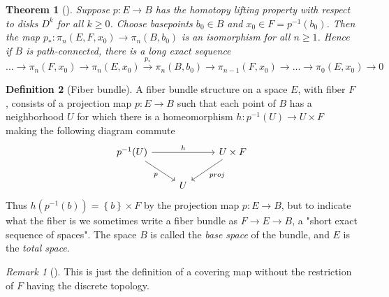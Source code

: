 \documentclass[reqno]{amsart}
\newtheorem{theorem}{Theorem}[section]
\theoremstyle{definition}
\newtheorem{definition}[theorem]{Definition}
\theoremstyle{remark}
\newtheorem*{remark}{Remark}
\begin{document}
\begin{theorem}[]
    Suppose $p \colon E \to B$ has the homotopy
    lifting property with respect to disks
    $D^{k}$ for all $k \ge 0$. Choose basepoints
    $b_0 \in B$ and
    $x_0 \in F = p^{-1}\left( b_0 \right) $. Then
    the map $p_* \colon \pi_n \left( E, F,x_0 \right) 
    \to \pi_n \left( B, b_0 \right) $ is an isomorphism
    for all $n\ge 1$. Hence if $B$ is
    path-connected, there is a long exact sequence
    \[
    \ldots \to \pi_n \left( F,x_0 \right) \to 
    \pi_n \left( E,x_0 \right) \stackrel{p_*}{\to }
    \pi_n \left( B,b_0 \right) \to 
    \pi_{n-1}(F,x_0) \to \ldots \to 
    \pi_0 \left( E,x_0 \right) \to 0
    \] 
\end{theorem}


\begin{definition}[Fiber bundle]
    A fiber bundle structure on a space $E$, with fiber
    $F$, consists of a projection map
    $p \colon E \to B$ such that each point of $B$ has
    a neighborhood $U$ for which there is a homeomorphism
    $h \colon p^{-1}(U) \to U \times F$ making
    the following diagram commute
    \begin{equation*}
    \begin{tikzcd}
        p^{-1}(U) \ar[rr, "h"] \ar[dr, "p"'] & & U \times F
        \ar[dl, "proj"] \\
                                            & U&
    \end{tikzcd}
    \end{equation*}
    Thus
    $h \left( p^{-1}(b) \right) 
    = \left\{ b \right\} \times F$ by the projection map 
    $p \colon E \to B$, but to indicate what the fiber
    is we sometimes write a fiber bundle as
    $F \to E \to B$, a "short exact sequence of spaces".
    The space $B$ is called the \textit{base space} of the
    bundle, and $E$ is the \textit{total space}.
\end{definition}          

\begin{remark}[]
    This is just the definition of a covering map
    without the restriction of $F$ having the discrete
    topology.
\end{remark}
          
          




\newpage


\end{document}
